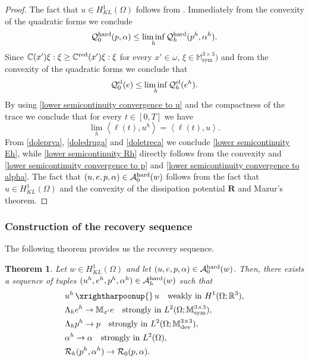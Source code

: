 \documentclass[reqno,10pt]{amsart}
\numberwithin{equation}{section}
\newtheorem{theorem}{Theorem}[section]
\theoremstyle{remark}
\newcommand{\calA}{\mathcal{A}}
\newcommand{\C}{\mathbb{C}}
\newcommand{\M}{\mathbb{M}}
\newcommand{\calQ}{\mathcal{Q}}
\newcommand{\R}{\mathbb{R}}
\newcommand{\calR}{\mathcal{R}}
\DeclareMathOperator{\dev}{dev}
\DeclareMathOperator{\sym}{sym}
\newcommand{\strong}{\to}
\newcommand{\weak}{\,\xrightharpoonup{}\,}
\newcommand{\disspot}{\mathbf{R}}
\newcommand{\red}[1]{#1^{\rm red}}
\begin{document}
\begin{proof}
The fact that $u \in H_{KL}^1(\Omega)$ follows from .
Immediately from the convexity of the quadratic forms we conclude
\begin{equation} \label{doleprva} 
	\calQ^{\rm hard}_{0}(p, \alpha) \leq \liminf\limits_{h} \calQ^{\rm hard}_{h}(p^h, \alpha^h). 
\end{equation}
Since $\C(x') \xi:\xi \geq \red{\C}(x') \xi:\xi$ for every $x' \in \omega$, $\xi \in \M^{3 \times 3}_{\sym})$ and from the convexity of the quadratic forms we conclude that 
\begin{equation} \label{doledruga}
	\calQ^{\rm el}_{0}(e) \leq \liminf\limits_{h} \calQ^{\rm el}_{h}(e^h). 
\end{equation}
By using \eqref{lower semicontinuity convergence to u} and the compactness of the trace we conclude that for every $t \in [0,T]$ we have 
\begin{equation} \label{doletreca} 
\lim_{h} \left\langle \ell(t), u^h\right \rangle = \left\langle \ell(t), u\right \rangle. 
\end{equation}
From \eqref{doleprva}, \eqref{doledruga} and \eqref{doletreca} we conclude \eqref{lower semicontinuity Eh}, while \eqref{lower semicontinuity Rh} directly follows from the convexity and \eqref{lower semicontinuity convergence to p} and \eqref{lower semicontinuity convergence to alpha}.
The fact that $(u, e, p, \alpha) \in \calA_{0}^{\rm hard}(w)$ follows from the fact that $u \in H_{KL}^1(\Omega)$ and the convexity of the dissipation potential $\disspot$ and Mazur's theorem. 
\end{proof}

\subsubsection{Construction of the recovery sequence}
The following theorem provides us the recovery sequence. 
\begin{theorem} \label{recovery sequence}
Let $w \in H^1_{KL}(\Omega)$ and let $(u, e, p, \alpha) \in \calA_{0}^{\rm hard}(w)$.
Then, there exists a sequence of tuples $(u^h, e^h, p^h, \alpha^h) \in \calA_{h}^{\rm hard}(w)$ such that
\begin{align}
	& u^h \weak u \quad \text{weakly in $H^1(\Omega;\R^3)$}, \label{recovery sequence convergence u}\\
	& \Lambda_h e^h \strong \M_{x'} e \quad \text{strongly in $L^2(\Omega;\M^{3 \times 3}_{\sym})$}, \label{recovery sequence convergence e}\\
	& \Lambda_h p^h \strong p \quad \text{strongly in $L^2(\Omega;\M^{3 \times 3}_{\dev})$}, \label{recovery sequence convergence p}\\
	& \alpha^h \strong \alpha \quad \text{strongly in $L^2(\Omega)$}, \label{recovery sequence convergence alpha}\\
	& \calR_{h}(p^h, \alpha^h) \to \calR_{0}(p, \alpha). \label{recovery sequence convergence dissipation}
\end{align}
\end{theorem}
\end{document}
